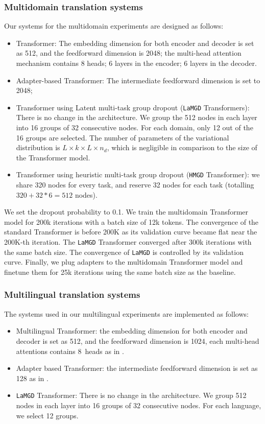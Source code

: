 \documentclass[11pt]{article}
\newcommand{\fyDone}[1]{\done[FY]\Todo[FY:]{\textcolor{orange}{#1}}}
\newcommand{\system}[1]{\texttt{{#1}}}
\begin{document}
\subsubsection{Multidomain translation systems}
Our systems for the multidomain experiments are designed as follows:
\begin{itemize}
\item Transformer: The embedding dimension for both encoder and decoder is set as 512, and the feedforward dimension is 2048; the multi-head attention mechanism contains 8 heads; 6 layers in the encoder; 6 layers in the decoder.\fyDone{How many layers}
\item Adapter-based Transformer: The intermediate feedforward dimension is set to 2048;%
\item Transformer using Latent multi-task group dropout (\system{LaMGD} Transformers):\fyDone{Explain acronym} There is no change in the architecture. We group the 512 nodes in each layer into 16 groups of 32 consecutive nodes. For each domain, only 12 out of the 16 groups are selected. The number of parameters of the variational distribution is $L\times k \times L \times n_d$, which is negligible in comparison to the size of the Transformer model.
\item Transformer using heuristic multi-task group dropout (\system{HMGD} Transformer): we share 320 nodes for every task, and reserve 32 nodes for each task (totalling $320 + 32*6 = 512$ nodes).
\end{itemize}

We set the dropout probability to 0.1. We train the multidomain Transformer model for 200k iterations with a batch size of 12k tokens. The convergence of the standard Transformer is before 200K as its validation curve became flat near the 200K-th iteration. The \system{LaMGD} Transformer converged after 300k iterations with the same batch size. The convergence of \system{LaMGD} is controlled by its validation curve. Finally, we plug adapters to the multidomain Transformer model and finetune them for 25k iterations using the same batch size as the baseline.

\subsubsection{Multilingual translation systems}
The systems used in our multilingual experiments are implemented as follows:
\begin{itemize}
\item Multilingual Transformer: the embedding dimension for both encoder and decoder is set as 512, and the feedforward dimension is 1024, each multi-head attentions contains 8~heads as in \citep{Wang20balancing}.
\item Adapter based Transformer: the intermediate feedforward dimension is set as 128 as in \citep{Gong21adaptive}.
\item \system{LaMGD} Transformer: There is no change in the architecture. We group 512 nodes in each layer into 16 groups of 32 consecutive nodes. For each language, we select 12 groups.
\end{itemize}
\end{document}

